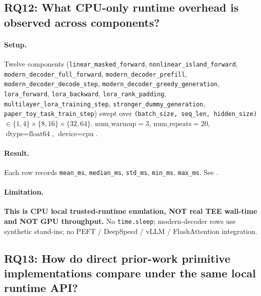 

\subsection{RQ12: What CPU-only runtime overhead is observed across components?}
\label{sec:eval:rq12}
\paragraph{Setup.} Twelve components (\texttt{linear\_masked\_forward}, \texttt{nonlinear\_island\_forward}, \texttt{modern\_decoder\_full\_forward}, \texttt{modern\_decoder\_prefill}, \texttt{modern\_decoder\_decode\_step}, \texttt{modern\_decoder\_greedy\_generation}, \texttt{lora\_forward}, \texttt{lora\_backward}, \texttt{lora\_rank\_padding}, \texttt{multilayer\_lora\_training\_step}, \texttt{stronger\_dummy\_generation}, \texttt{paper\_toy\_task\_train\_step}) swept over \texttt{(batch\_size, seq\_len, hidden\_size)} $\in \{1,4\} \times \{8, 16\} \times \{32, 64\}$. $\text{num\_warmup}=3$, $\text{num\_repeats}=20$, $\text{dtype}=\text{float64}$, $\text{device}=\text{cpu}$.

\paragraph{Result.} Each row records \texttt{mean\_ms}, \texttt{median\_ms}, \texttt{std\_ms}, \texttt{min\_ms}, \texttt{max\_ms}. See .

\paragraph{Limitation.} \textbf{This is CPU local trusted-runtime emulation, NOT real TEE wall-time and NOT GPU throughput.} No \texttt{time.sleep}; modern-decoder rows use synthetic stand-ins; no PEFT / DeepSpeed / vLLM / FlashAttention integration.



\subsection{RQ13: How do direct prior-work primitive implementations compare under the same local runtime API?}
\label{sec:eval:rq13}
